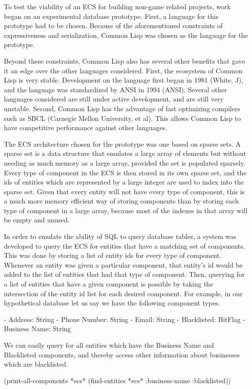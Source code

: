 \documentclass[conference]{IEEEtran}
\begin{document}
\begin{Methodology}
To test the viability of an ECS for building non-game related projects, work began on an experimental database prototype. First, a language for this prototype had to be chosen. Because of the aforementioned constraints of expressiveness and serialization, Common Lisp was chosen as the language for the prototype. 

Beyond these constraints, Common Lisp also has several other benefits that gave it an edge over the other languages considered. First, the ecosystem of Common Lisp is very stable. Development on the language first began in 1981 (White, J), and the language was standardized by ANSI in 1994 (ANSI). Several other languages considered are still under active development, and are still very unstable. Second, Common Lisp has the advantage of fast optimizing compilers such as SBCL (Carnegie Mellon University, et al). This allows Common Lisp to have competitive performance against other languages. 

The ECS architecture chosen for the prototype was one based on sparse sets. A sparse set is a data structure that emulates a large array of elements but without needing as much memory as a large array, provided the set is populated sparsely. Every type of component in the ECS is then stored in its own sparse set, and the ids of entities which are represented by a large integer are used to index into the sparse set. Given that every entity will not have every type of component, this is a much more memory efficient way of storing components than by storing each type of component in a large array, because most of the indexes in that array will be empty and unused. 

In order to emulate the ability of SQL to query database tables, a system was developed to query the ECS for entities that have a matching set of components. This was done by storing a list of entity ids for every type of component. Whenever an entity was given a particular component, that entity’s id would be added to the list of entities that had that type of component. Then, querying for a list of entities that have a given component is possible by taking the intersection of the entity id list for each desired component. 
For example, in our hypothetical database let us say we have the following component types.

- Address: String
- Phone Number: String
- Email: String
- Blacklisted: BitFlag
- Business Name: String

We can easily query for all entities which have the Business Name and Blacklisted components, and thereby access other information about businesses which are blacklisted.

(print-all-components *ecs* 
  (find-entities *ecs* 
     :business-name :blacklisted))
\end {Methodology}
\end{document}
